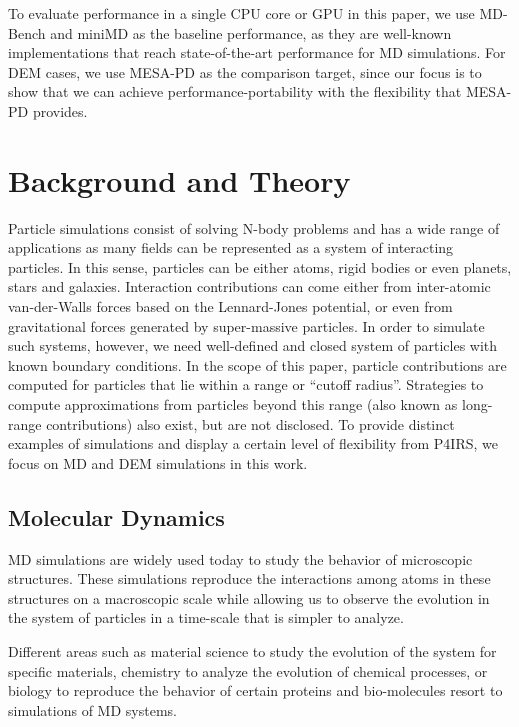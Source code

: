 \documentclass[preprint,12pt]{elsarticle}
\begin{document}
To evaluate performance in a single CPU core or GPU in this paper, we use MD-Bench and miniMD as the baseline performance, as they are well-known implementations that reach state-of-the-art performance for MD simulations.
For DEM cases, we use MESA-PD as the comparison target, since our focus is to show that we can achieve performance-portability with the flexibility that MESA-PD provides. 

\section{Background and Theory}
\label{sec:background}

Particle simulations consist of solving N-body problems and has a wide range of applications as many fields can be represented as a system of interacting particles.
In this sense, particles can be either atoms, rigid bodies or even planets, stars and galaxies.
Interaction contributions can come either from inter-atomic van-der-Walls forces based on the Lennard-Jones potential, or even from gravitational forces generated by super-massive particles.
In order to simulate such systems, however, we need well-defined and closed system of particles with known boundary conditions.
In the scope of this paper, particle contributions are computed for particles that lie within a range or ``cutoff radius''. 
Strategies to compute approximations from particles beyond this range (also known as long-range contributions) also exist, but are not disclosed.
To provide distinct examples of simulations and display a certain level of flexibility from P4IRS, we focus on MD and DEM simulations in this work.

\subsection{Molecular Dynamics}
\label{sec:md}

\ac{MD} simulations are widely used today to study the behavior of microscopic structures.
These simulations reproduce the interactions among atoms in these structures on a macroscopic scale while allowing us to observe the evolution in the system of particles in a time-scale that is simpler to analyze.

Different areas such as material science to study the evolution of the system for specific materials, chemistry to analyze the evolution of chemical processes, or biology to reproduce the behavior of certain proteins and bio-molecules resort to simulations of \ac{MD} systems.
\end{document}

